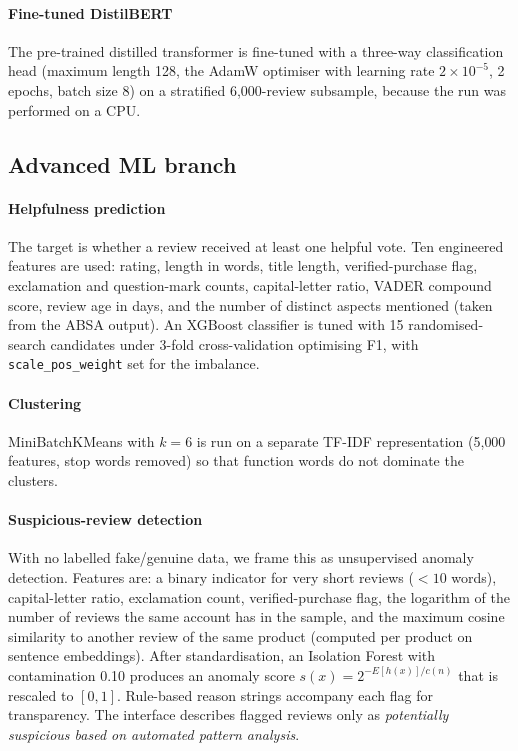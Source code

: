 \documentclass[conference]{IEEEtran}
\begin{document}
\paragraph{Fine-tuned DistilBERT} The pre-trained distilled transformer \cite{sanh2019distilbert} is fine-tuned with a three-way classification head (maximum length 128, the AdamW optimiser with learning rate $2\times10^{-5}$, 2 epochs, batch size 8) on a stratified 6{,}000-review subsample, because the run was performed on a CPU.

\subsection{Advanced ML branch}
\paragraph{Helpfulness prediction} The target is whether a review received at least one helpful vote. Ten engineered features are used: rating, length in words, title length, verified-purchase flag, exclamation and question-mark counts, capital-letter ratio, VADER compound score, review age in days, and the number of distinct aspects mentioned (taken from the ABSA output). An XGBoost classifier \cite{chen2016xgboost} is tuned with 15 randomised-search candidates under 3-fold cross-validation optimising F1, with \texttt{scale\_pos\_weight} set for the imbalance.
\paragraph{Clustering} MiniBatchKMeans with $k=6$ is run on a separate TF-IDF representation (5{,}000 features, stop words removed) so that function words do not dominate the clusters.
\paragraph{Suspicious-review detection} With no labelled fake/genuine data, we frame this as unsupervised anomaly detection. Features are: a binary indicator for very short reviews ($<10$ words), capital-letter ratio, exclamation count, verified-purchase flag, the logarithm of the number of reviews the same account has in the sample, and the maximum cosine similarity to another review of the same product (computed per product on sentence embeddings). After standardisation, an Isolation Forest \cite{liu2008isolation} with contamination 0.10 produces an anomaly score $s(x)=2^{-E[h(x)]/c(n)}$ that is rescaled to $[0,1]$. Rule-based reason strings accompany each flag for transparency. The interface describes flagged reviews only as \emph{potentially suspicious based on automated pattern analysis}.
\end{document}
